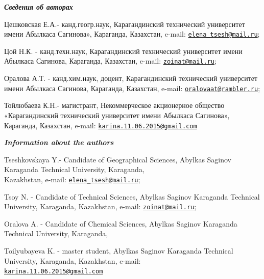 \begin{authorinfo}
\emph{{\bfseries Сведения об авторах}}

Цешковская Е.А.- канд.геогр.наук, Карагандинский технический университет
имени Абылкаса Сагинова», Караганда, Казахстан, e-mail:
\href{mailto:elena_tsesh@mail.ru}{\nolinkurl{elena\_tsesh@mail.ru}};

Цой Н.К. - канд.техн.наук, Карагандинский технический университет имени
Абылкаса Сагинова, Караганда, Казахстан, e-mail:
\href{mailto:zoinat@mail.ru}{\nolinkurl{zoinat@mail.ru}};

Оралова А.Т. - канд.хим.наук, доцент, Карагандинский технический
университет имени Абылкаса Сагинова, Караганда, Казахстан, e-mail:
\href{mailto:oralovaat@rambler.ru}{\nolinkurl{oralovaat@rambler.ru}};

Тойлюбаева К.Н.- магистрант, Некоммерческое акционерное общество
«Карагандинский технический университет имени Абылкаса Сагинова»,
Караганда, Казахстан, e-mail:
\href{mailto:karina.11.06.2015@gmail.com}{\nolinkurl{karina.11.06.2015@gmail.com}}

\emph{{\bfseries Information about the authors}}

Tseshkovskaya Y.- Candidate of Geographical Sciences, Abylkas Saginov
Karaganda Technical University, Karaganda, \\Kazakhstan, e-mail:
\href{mailto:elena_tsesh@mail.ru}{\nolinkurl{elena\_tsesh@mail.ru}};

Tsoy N. - Candidate of Technical Sciences, Abylkas Saginov Karaganda
Technical University, Karaganda, Kazakhstan, e-mail:
\href{mailto:zoinat@mail.ru}{\nolinkurl{zoinat@mail.ru}};

Oralova A. - Candidate of Chemical Sciences, Abylkas Saginov Karaganda
Technical University, Karaganda,

Toilyubayeva K. - master student, Abylkas Saginov Karaganda Technical
University, Karaganda, Kazakhstan, e-mail:\\
\href{mailto:karina.11.06.2015@gmail.com}{\nolinkurl{karina.11.06.2015@gmail.com}}
\end{authorinfo}
